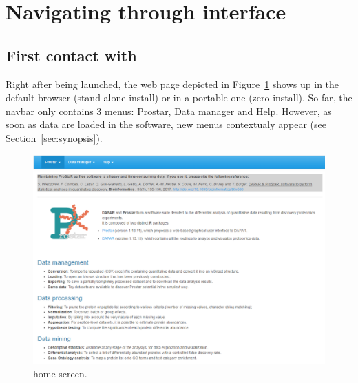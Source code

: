 \documentclass[12pt]{article}
\begin{document}

\section{Navigating through  interface}

\subsection{First contact with }\label{sec:firstcontact}
Right after  being launched, the web page depicted in Figure~\ref{fig:fig1} shows up in the default browser (stand-alone install) or in a portable one (zero install).
So far, the navbar only contains 3 menus: Prostar, Data manager and Help. However, as soon as data are loaded in the software, new menus contextualy appear (see Section~\ref{sec:synopsis}).

\begin{figure}
	\includegraphics[width=\textwidth]{images/home.png}
	\caption{ home screen.}
	\label{fig:fig1}
\end{figure}
\end{document}
